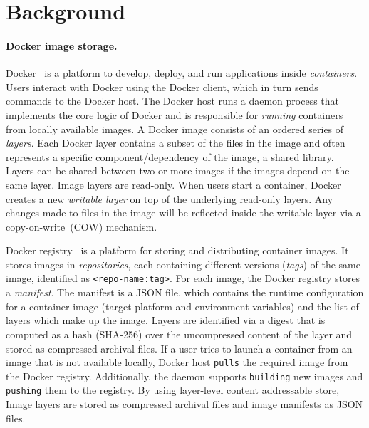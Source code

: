 \section{Background}
\label{sec:background}

\paragraph{Docker image storage.} Docker~\cite{docker} is a platform to
develop, deploy, and run applications inside \emph{containers}.
%
Users interact with Docker using the Docker client, which in turn sends
commands to the Docker host.
%
The Docker host runs a daemon process that implements the core logic of Docker
and is responsible for \emph{running} containers from locally available images.
%
A Docker image consists of an ordered series of \emph{layers}.
%
Each Docker layer contains a subset of the files in the image and often
represents a specific component/dependency of the image, \eg a shared library.
%
Layers can be shared between two or more images if the images depend on the
same layer.
%
Image layers are read-only.
%
When users start a container, Docker creates a new \emph{writable layer} on top
of the underlying read-only layers.
%
%
Any changes made to files in the image will be reflected inside the writable
layer via a copy-on-write~(COW) mechanism.
%




Docker registry~\cite{docker-hub} is a platform for storing and distributing
container images.
%
It stores images in \emph{repositories}, each containing different versions
(\emph{tags}) of the same image, identified as \texttt{<repo-name:tag>}.
%
For each image, the Docker registry stores a \emph{manifest}.
%
The manifest is a JSON file, which contains the runtime configuration for a
container image (\eg target platform and environment variables) and the list of
layers which make up the image.
%
Layers are identified via a digest that is computed as a hash (SHA-256) over
the uncompressed content of the layer and stored as compressed archival files.
%
If a user tries to launch a container from an image that is not available
locally, Docker host \texttt{pulls} the required image from the Docker
registry.
%
Additionally, the daemon supports \texttt{building} new images and
\texttt{pushing} them to the registry.
%
By using layer-level content addressable store, Image layers are stored as
compressed archival files and image manifests as JSON files.


